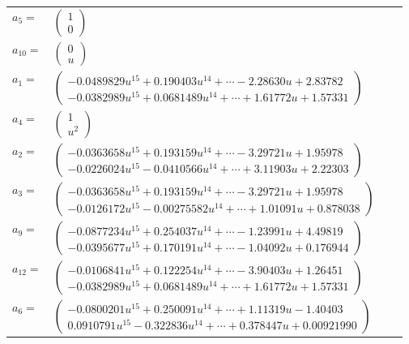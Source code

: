 \documentclass[1p]{elsarticle_modified}
\theoremstyle{definition}
\begin{document}
\begin{tabular}{m{7pt} m{180pt} m{7pt} m{180pt} }
\flushright $a_{5}=$&$\begin{pmatrix}1\\0\end{pmatrix}$ \\
\flushright $a_{10}=$&$\begin{pmatrix}0\\u\end{pmatrix}$ \\
\flushright $a_{1}=$&$\begin{pmatrix}-0.0489829 u^{15}+0.190403 u^{14}+\cdots-2.28630 u+2.83782\\-0.0382989 u^{15}+0.0681489 u^{14}+\cdots+1.61772 u+1.57331\end{pmatrix}$ \\
\flushright $a_{4}=$&$\begin{pmatrix}1\\u^2\end{pmatrix}$ \\
\flushright $a_{2}=$&$\begin{pmatrix}-0.0363658 u^{15}+0.193159 u^{14}+\cdots-3.29721 u+1.95978\\-0.0226024 u^{15}-0.0410566 u^{14}+\cdots+3.11903 u+2.22303\end{pmatrix}$ \\
\flushright $a_{3}=$&$\begin{pmatrix}-0.0363658 u^{15}+0.193159 u^{14}+\cdots-3.29721 u+1.95978\\-0.0126172 u^{15}-0.00275582 u^{14}+\cdots+1.01091 u+0.878038\end{pmatrix}$ \\
\flushright $a_{9}=$&$\begin{pmatrix}-0.0877234 u^{15}+0.254037 u^{14}+\cdots-1.23991 u+4.49819\\-0.0395677 u^{15}+0.170191 u^{14}+\cdots-1.04092 u+0.176944\end{pmatrix}$ \\
\flushright $a_{12}=$&$\begin{pmatrix}-0.0106841 u^{15}+0.122254 u^{14}+\cdots-3.90403 u+1.26451\\-0.0382989 u^{15}+0.0681489 u^{14}+\cdots+1.61772 u+1.57331\end{pmatrix}$ \\
\flushright $a_{6}=$&$\begin{pmatrix}-0.0800201 u^{15}+0.250091 u^{14}+\cdots+1.11319 u-1.40403\\0.0910791 u^{15}-0.322836 u^{14}+\cdots+0.378447 u+0.00921990\end{pmatrix}$ \\

\end{tabular}
\end{document}
